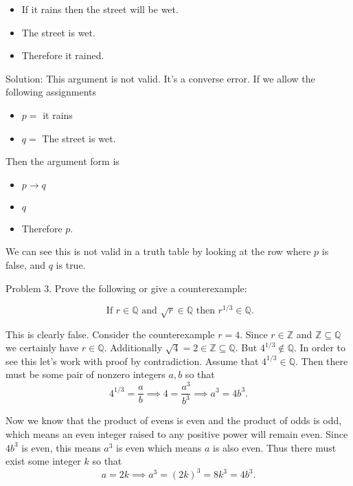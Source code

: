 \documentclass[16 pt]{amsart}
\theoremstyle{definition}
\theoremstyle{remark}
\numberwithin{equation}{subsection}
\newcommand{\Z}{\mathbb{Z}}
\newcommand{\Q}{\mathbb{Q}}
\begin{document}
\begin{itemize}
\item[] If it rains then the street will be wet.\\
\item[] The street is wet.\\
\item[] Therefore it rained.
\end{itemize}

\vspace{.5in}

Solution:  This argument is not valid.  It's a converse error.  If we allow the following assignments

\begin{itemize}
\item[] $p = $ it rains \\
\item[] $q = $ The street is wet.\\
\end{itemize}

Then the argument form is 
\begin{itemize}
\item[] $p\rightarrow q$\\
\item[] $q$\\
\item[] Therefore $p$.
\end{itemize}

We can see this is not valid in a truth table by looking at the row where $p$ is false, and $q$ is true.


\newpage

Problem 3. Prove the following or give a counterexample:

\[
\text{ If } r\in\Q \text{ and } \sqrt{r}\in\Q \text{ then } r^{1/3}\in\Q.
\]


\vspace{.5in}

This is clearly false.  Consider the counterexample $r=4$.
Since $r\in\Z$ and $\Z \subseteq \Q$ we certainly have $r\in \Q$.  Additionally $\sqrt{4} = 2 \in\Z \subseteq \Q$.  But $4^{1/3} \notin \Q$.  In order to see this let's work with proof by contradiction.  Assume that $4^{1/3}\in\Q$.  Then there must be some pair of nonzero integers $a,b$ so that
\[
4^{1/3} = \frac{a}{b} \implies 4 = \frac{a^3}{b^3} \implies a^3 = 4b^3.
\]


Now we know that the product of evens is even and the product of odds is odd, which means an even integer raised to any positive power will remain even.  Since $4b^3$ is even, this means $a^3$ is even which means $a$ is also even.  Thus there must exist some integer $k$ so that
\[
a= 2k  \implies a^3 = (2k)^3 = 8 k^3 = 4b^3.
\]
\end{document}
